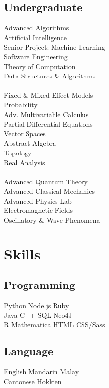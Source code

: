 \documentclass{deedy-resume-openfont}
\begin{document}
\begin{minipage}[t]{0.33\textwidth}
\subsection{Undergraduate}
Advanced Algorithms \\
Artificial Intelligence \\
Senior Project: Machine Learning \\
Software Engineering \\
Theory of Computation \\
Data Structures \& Algorithms \\
\ \\
Fixed \& Mixed Effect Models \\
Probability \\
Adv. Multivariable Calculus \\
Partial Differential Equations \\
Vector Spaces \\
Abstract Algebra \\
Topology \\
Real Analysis \\
\ \\
Advanced Quantum Theory \\
Advanced Classical Mechanics \\
Advanced Physics Lab \\
Electromagnetic Fields \\
Oscillatory \& Wave Phenomena \\

\sectionsep


\section{Skills}
\subsection{Programming}
Python \textbullet{} Node.js \textbullet{} Ruby \\

Java \textbullet{} C++ \textbullet{} SQL \textbullet{} Neo4J \\
R \textbullet{} Mathematica \textbullet{} HTML \textbullet{} CSS/Sass \\ 
\sectionsep

\subsection{Language}
English \textbullet{} Mandarin \textbullet{} Malay \\ 
Cantonese \textbullet{} Hokkien
\sectionsep

%
%

\end{minipage} 
\end{document}
